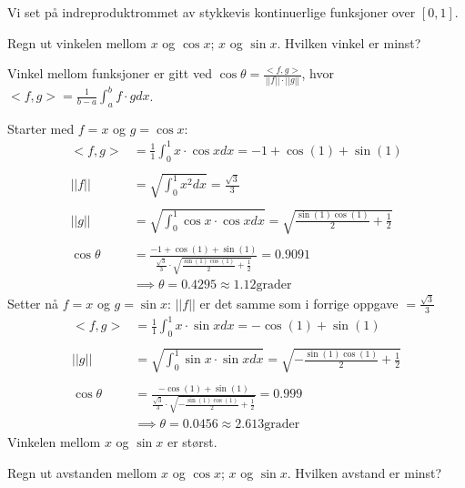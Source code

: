 \documentclass[11pt, a4paper, norsk]{NTNUoving}
\begin{document}
    \begin{oppgave}
        Vi set på indreproduktrommet av stykkevis kontinuerlige funksjoner over $[0, 1]$.
        \begin{punkt}
            Regn ut vinkelen mellom $x$ og $\cos{x}$; $x$ og $\sin{x}$. Hvilken vinkel er minst?

            Vinkel mellom funksjoner er gitt ved $\cos{\theta} = \frac{<f, g>}{||f|| \cdot ||g||}$, hvor $<f, g> = \frac{1}{b-a}\int_{a}^{b}f \cdot g dx$. 

            Starter med $f = x$ og $g = \cos{x}$:
            \begin{align*}
                <f, g> &= \frac{1}{1}\int_{0}^{1}x \cdot \cos{x} dx = -1 + \cos{\left(1 \right)} + \sin{\left(1 \right)} \\
                \\
                ||f|| &= \sqrt{\int_{0}^{1}x^2 dx} = \frac{\sqrt{3}}{3} 
                \\
                \\
                ||g|| &= \sqrt{\int_{0}^{1}\cos{x} \cdot \cos{x} dx} = \sqrt{\frac{\sin{\left(1 \right)} \cos{\left(1 \right)}}{2} + \frac{1}{2}}
                \\
                \\
                \cos{\theta} &= \frac{-1 + \cos{\left(1 \right)} + \sin{\left(1 \right)}}{\frac{\sqrt{3}}{3} \cdot \sqrt{\frac{\sin{\left(1 \right)} \cos{\left(1 \right)}}{2} + \frac{1}{2}}} = 0.9091 
                \\
                             &\implies \theta = 0.4295 \approx 1.12 \text{grader}
            \end{align*}
            Setter nå $f = x$ og $g = \sin{x}$: $||f||$ er det samme som i forrige oppgave $= \frac{\sqrt{3}}{3}$
            \begin{align*}
                <f, g> &= \frac{1}{1}\int_{0}^{1}x \cdot \sin{x} dx = - \cos{\left(1 \right)} + \sin{\left(1 \right)}
                \\
                \\
                ||g|| &= \sqrt{\int_{0}^{1}\sin{x} \cdot \sin{x}dx} = \sqrt{- \frac{\sin{\left(1 \right)} \cos{\left(1 \right)}}{2} + \frac{1}{2}}
                \\
                \\
                \cos{\theta} &= \frac{ - \cos{\left(1 \right)} + \sin{\left(1 \right)}}{\frac{\sqrt{3}}{3} \cdot \sqrt{- \frac{\sin{\left(1 \right)} \cos{\left(1 \right)}}{2} + \frac{1}{2}}} = 0.999
                \\
                             &\implies \theta = 0.0456 \approx 2.613 \text{grader}
            \end{align*}
            Vinkelen mellom $x$ og $\sin{x}$ er størst.
        \end{punkt}
        \begin{punkt}
            Regn ut avstanden mellom $x$ og $\cos{x}$; $x$ og $\sin{x}$. Hvilken avstand er minst?


\end{punkt}
\end{oppgave}
\end{document}
